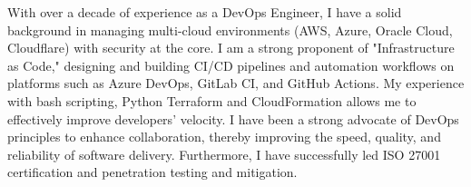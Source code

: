 

\begin{cvparagraph}

\end{cvparagraph}
With over a decade of experience as a DevOps Engineer, I have a solid background in managing multi-cloud environments (AWS, Azure, Oracle Cloud, Cloudflare) with security at the core. I am a strong proponent of "Infrastructure as Code," designing and building CI/CD pipelines and automation workflows on platforms such as Azure DevOps, GitLab CI, and GitHub Actions. My experience with bash scripting, Python Terraform and CloudFormation allows me to effectively improve developers' velocity. I have been a strong advocate of DevOps principles to enhance collaboration, thereby improving the speed, quality, and reliability of software delivery. Furthermore, I have successfully led ISO 27001 certification and penetration testing and mitigation.

